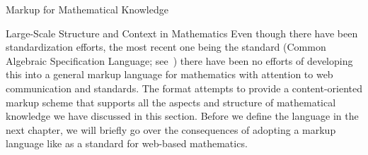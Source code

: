 \begin{omgroup}[id=math-markup]{Markup for Mathematical Knowledge}
\begin{module}[id=math-context]
\begin{omgroup}[id=meta-theories]{Large-Scale Structure and Context in Mathematics}
  Even though there have been standardization efforts, the most recent one being the
  {\casl} standard (Common Algebraic Specification Language; see~\cite{CoFI:2004:CASL-RM}) there have
  been no efforts of developing this into a general markup language for mathematics with
  attention to web communication and standards. The {\omdoc} format attempts to provide a
  content-oriented markup scheme that supports all the aspects and structure of
  mathematical knowledge we have discussed in this section. Before we define the language
  in the next chapter, we will briefly go over the consequences of adopting a markup
  language like {\omdoc} as a standard for web-based mathematics.
\end{omgroup}
\end{module}
\end{omgroup}



